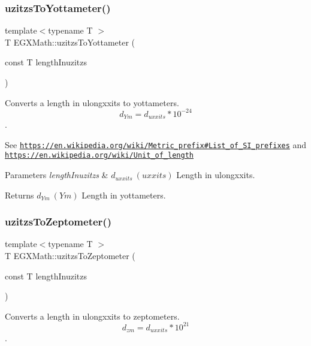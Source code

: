 \subsubsection{\texorpdfstring{uzitzs\+To\+Yottameter()}{uzitzsToYottameter()}}
{\footnotesize\ttfamily template$<$typename T $>$ \\
T E\+G\+X\+Math\+::uzitzs\+To\+Yottameter (\begin{DoxyParamCaption}\item[{const T}]{length\+Inuzitzs }\end{DoxyParamCaption})}



Converts a length in ulongxxits to yottameters. \[ d_{Ym}=d_{uxxits} * 10^{-24} \]. 

See \href{https://en.wikipedia.org/wiki/Metric_prefix#List_of_SI_prefixes}{\tt https\+://en.\+wikipedia.\+org/wiki/\+Metric\+\_\+prefix\#\+List\+\_\+of\+\_\+\+S\+I\+\_\+prefixes} and \href{https://en.wikipedia.org/wiki/Unit_of_length}{\tt https\+://en.\+wikipedia.\+org/wiki/\+Unit\+\_\+of\+\_\+length} 
\begin{DoxyParams}{Parameters}
{\em length\+Inuzitzs} & $ d_{uxxits}\ (uxxits)$ Length in ulongxxits. \\
\hline
\end{DoxyParams}
\begin{DoxyReturn}{Returns}
$ d_{Ym}\ (Ym)$ Length in yottameters. 
\end{DoxyReturn}
\mbox{\label{group___e_g_x_math-_conversions-_length_conversions-uzitzs-_s_i_ga9057f57c3f49216e6272c6f0f29ded62}} 
\subsubsection{\texorpdfstring{uzitzs\+To\+Zeptometer()}{uzitzsToZeptometer()}}
{\footnotesize\ttfamily template$<$typename T $>$ \\
T E\+G\+X\+Math\+::uzitzs\+To\+Zeptometer (\begin{DoxyParamCaption}\item[{const T}]{length\+Inuzitzs }\end{DoxyParamCaption})}



Converts a length in ulongxxits to zeptometers. \[ d_{zm}=d_{uxxits} * 10^{21} \]. 

